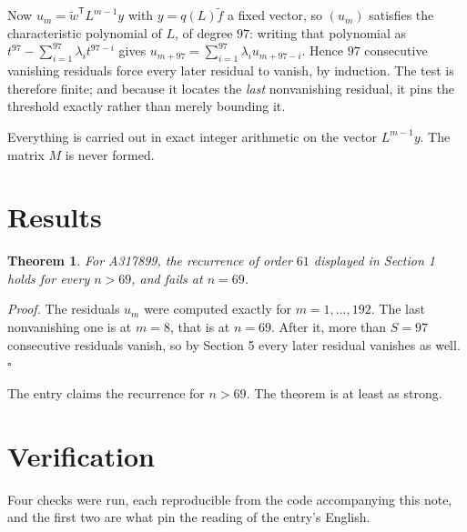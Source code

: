 \documentclass[11pt]{article}
\newtheorem{theorem}{Theorem}
\theoremstyle{definition}
\begin{document}
Now $u_m = \tilde w^{\mathsf T} L^{m-1} y$ with $y = q(L)\tilde f$ a fixed vector, so $(u_m)$ satisfies the characteristic polynomial of $L$, of degree $97$: writing that polynomial as $t^{97} - \sum_{i=1}^{97} \lambda_i t^{97-i}$ gives $u_{m+97} = \sum_{i=1}^{97} \lambda_i u_{m+97-i}$. Hence $97$ consecutive vanishing residuals force every later residual to vanish, by induction. The test is therefore finite; and because it locates the {\itshape last} nonvanishing residual, it pins the threshold exactly rather than merely bounding it.

Everything is carried out in exact integer arithmetic on the vector $L^{m-1}y$. The matrix $M$ is never formed.

\section{Results}

\begin{theorem} For A317899, the recurrence of order $61$ displayed in Section 1 holds for every $n > 69$, and fails at $n = 69$.\end{theorem}

{\itshape Proof.} The residuals $u_m$ were computed exactly for $m = 1,\dots,192$. The last nonvanishing one is at $m = 8$, that is at $n = 69$. After it, more than $S = 97$ consecutive residuals vanish, so by Section 5 every later residual vanishes as well. $\square$

The entry claims the recurrence for $n > 69$. The theorem is at least as strong.

\section{Verification}

Four checks were run, each reproducible from the code accompanying this note, and the first two are what pin the reading of the entry's English.
\end{document}
